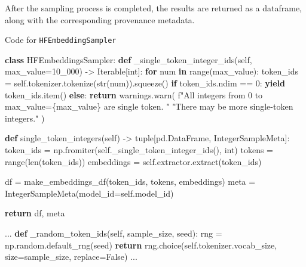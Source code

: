 \documentclass[
  a4paper, twoside, 10pt, titlepage]{book}
\newenvironment{Shaded}{}{}
\newcommand{\BuiltInTok}[1]{\textcolor[rgb]{0.00,0.50,0.00}{#1}}
\newcommand{\ControlFlowTok}[1]{\textcolor[rgb]{0.00,0.44,0.13}{\textbf{#1}}}
\newcommand{\DecValTok}[1]{\textcolor[rgb]{0.25,0.63,0.44}{#1}}
\newcommand{\KeywordTok}[1]{\textcolor[rgb]{0.00,0.44,0.13}{\textbf{#1}}}
\newcommand{\NormalTok}[1]{#1}
\newcommand{\OperatorTok}[1]{\textcolor[rgb]{0.40,0.40,0.40}{#1}}
\newcommand{\SpecialCharTok}[1]{\textcolor[rgb]{0.25,0.44,0.63}{#1}}
\newcommand{\SpecialStringTok}[1]{\textcolor[rgb]{0.73,0.40,0.53}{#1}}
\newcommand{\StringTok}[1]{\textcolor[rgb]{0.25,0.44,0.63}{#1}}
\newcommand{\VariableTok}[1]{\textcolor[rgb]{0.10,0.09,0.49}{#1}}
\begin{document}
After the sampling process is completed, the results are returned as a
dataframe, along with the corresponding provenance metadata.

\begin{codelisting}

\caption{Code for \texttt{HFEmbeddingSampler}}\label{lst:sampler}

\begin{Shaded}
\begin{Highlighting}[]

\KeywordTok{class}\NormalTok{ HFEmbeddingsSampler:}
    \KeywordTok{def}\NormalTok{ \_single\_token\_integer\_ids(}\VariableTok{self}\NormalTok{, max\_value}\OperatorTok{=}\DecValTok{10\_000}\NormalTok{) }\OperatorTok{{-}\textgreater{}}\NormalTok{ Iterable[}\BuiltInTok{int}\NormalTok{]:}
        \ControlFlowTok{for}\NormalTok{ num }\KeywordTok{in} \BuiltInTok{range}\NormalTok{(max\_value):}
\NormalTok{            token\_ids }\OperatorTok{=} \VariableTok{self}\NormalTok{.tokenizer.tokenize(}\BuiltInTok{str}\NormalTok{(num)).squeeze()}
            \ControlFlowTok{if}\NormalTok{ token\_ids.ndim }\OperatorTok{==} \DecValTok{0}\NormalTok{:}
                \ControlFlowTok{yield}\NormalTok{ token\_ids.item()}
            \ControlFlowTok{else}\NormalTok{:}
                \ControlFlowTok{return}
\NormalTok{        warnings.warn(}
            \SpecialStringTok{f"All integers from 0 to max\_value=}\SpecialCharTok{\{}\NormalTok{max\_value}\SpecialCharTok{\}}\SpecialStringTok{ are single token. "}
            \StringTok{"There may be more single{-}token integers."}
\NormalTok{        )}

    \KeywordTok{def}\NormalTok{ single\_token\_integers(}\VariableTok{self}\NormalTok{) }\OperatorTok{{-}\textgreater{}} \BuiltInTok{tuple}\NormalTok{[pd.DataFrame, IntegerSampleMeta]:}
\NormalTok{        token\_ids }\OperatorTok{=}\NormalTok{ np.fromiter(}\VariableTok{self}\NormalTok{.\_single\_token\_integer\_ids(), }\BuiltInTok{int}\NormalTok{)}
\NormalTok{        tokens }\OperatorTok{=} \BuiltInTok{range}\NormalTok{(}\BuiltInTok{len}\NormalTok{(token\_ids))}
\NormalTok{        embeddings }\OperatorTok{=} \VariableTok{self}\NormalTok{.extractor.extract(token\_ids)}

\NormalTok{        df }\OperatorTok{=}\NormalTok{ make\_embeddings\_df(token\_ids, tokens, embeddings)}
\NormalTok{        meta }\OperatorTok{=}\NormalTok{ IntegerSampleMeta(model\_id}\OperatorTok{=}\VariableTok{self}\NormalTok{.model\_id)}

        \ControlFlowTok{return}\NormalTok{ df, meta}

\NormalTok{    ...}
    \KeywordTok{def}\NormalTok{ \_random\_token\_ids(}\VariableTok{self}\NormalTok{, sample\_size, seed):}
\NormalTok{        rng }\OperatorTok{=}\NormalTok{ np.random.default\_rng(seed)}
        \ControlFlowTok{return}\NormalTok{ rng.choice(}\VariableTok{self}\NormalTok{.tokenizer.vocab\_size, size}\OperatorTok{=}\NormalTok{sample\_size, replace}\OperatorTok{=}\VariableTok{False}\NormalTok{)}
\NormalTok{    ...}
\end{Highlighting}
\end{Shaded}

\end{codelisting}
\end{document}
